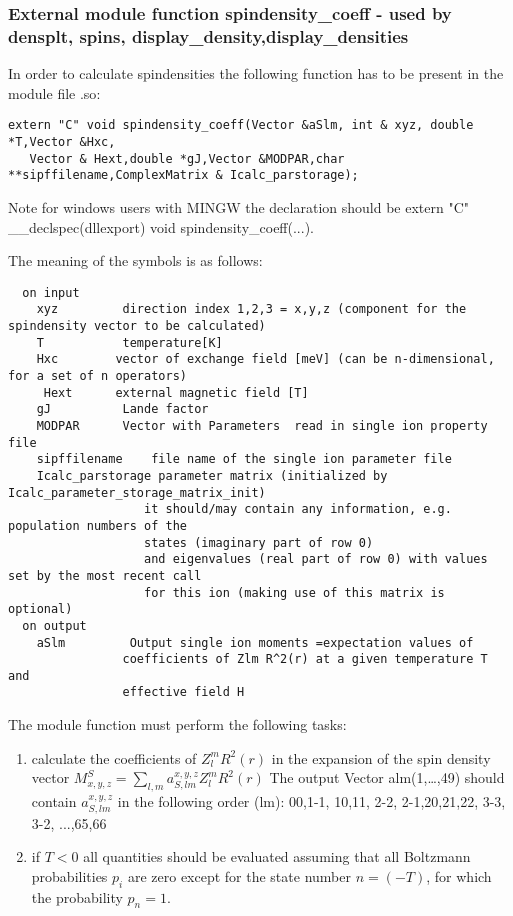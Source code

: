 \subsubsection{External module function {\prg spindensity\_coeff} -
used by {\prg densplt},
{\prg spins},
{\prg display\_density},{\prg display\_densities}}

In order to calculate spindensities
the following function has to be
present in the module file {\prg *.so}:

\begin{verbatim}
extern "C" void spindensity_coeff(Vector &aSlm, int & xyz, double *T,Vector &Hxc, 
   Vector & Hext,double *gJ,Vector &MODPAR,char **sipffilename,ComplexMatrix & Icalc_parstorage);
\end{verbatim}

Note for windows users with MINGW the declaration should be {\prg extern "C" \_\_declspec(dllexport) void %
spindensity\_coeff(...)}.

The meaning of the symbols is as follows:
{\footnotesize
\begin{verbatim}
  on input
    xyz         direction index 1,2,3 = x,y,z (component for the spindensity vector to be calculated)
    T           temperature[K]
    Hxc        vector of exchange field [meV] (can be n-dimensional, for a set of n operators)
     Hext      external magnetic field [T]
    gJ          Lande factor
    MODPAR      Vector with Parameters  read in single ion property file
    sipffilename    file name of the single ion parameter file
    Icalc_parstorage parameter matrix (initialized by Icalc_parameter_storage_matrix_init)
                   it should/may contain any information, e.g. population numbers of the
				   states (imaginary part of row 0)
                   and eigenvalues (real part of row 0) with values set by the most recent call
                   for this ion (making use of this matrix is optional)
  on output
    aSlm         Output single ion moments =expectation values of
                coefficients of Zlm R^2(r) at a given temperature T and
                effective field H
\end{verbatim}
}

The module function must perform the following tasks:
\begin{enumerate}
\item calculate the coefficients of $Z_l^m R^2(r)$ in the expansion of
      the spin density vector $M^S_{x,y,z}=\sum_{l,m} a^{x,y,z}_{S,lm} Z_l^m R^2(r)$
      The output Vector alm(1,\dots,49) should contain  $a^{x,y,z}_{S,lm}$
      in the following order (lm):  00,1-1, 10,11, 2-2, 2-1,20,21,22, 3-3, 3-2, ...,65,66
\item if $T<0$ all quantities should be evaluated assuming that all Boltzmann probabilities $p_i$
 are zero except for the state number $n=(-T)$, for which the probability $p_n=1$.
\end{enumerate}

